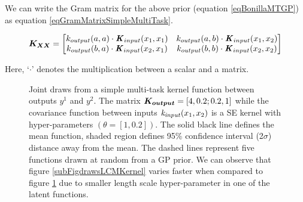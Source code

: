 We can write the Gram matrix for the above prior (equation \ref{eqBonillaMTGP}) as equation \ref{eqGramMatrixSimpleMultiTask}.

\begin{equation}\label{eqGramMatrixSimpleMultiTask}
   \boldsymbol{K_{XX}} =  \begin{bmatrix} k_{output}(a, a) \cdot \bm{\mathit{K}}_{input}(x_{1}, x_{1}) & 
k_{output}(a, b) \cdot \bm{\mathit{K}}_{input}(x_{1}, x_{2}) \\ 
k_{output}(b, a) \cdot \bm{\mathit{K}}_{input}(x_{2}, x_{1}) &
k_{output}(b, b) \cdot \bm{\mathit{K}}_{input}(x_{2}, x_{2}) 
\end{bmatrix}
\end{equation}


Here, `$\cdot$' denotes the multiplication between a scalar and a matrix. 

\begin{figure}[!ht]
  \centering
    \quad
{}\quad

       \caption{Joint draws from a simple multi-task kernel function between outputs $y^{1}$ and $y^{2}$. The matrix  $\boldsymbol{K_{output}} = [4 , 0.2; 0.2 , 1]$ while the covariance function between inputs $\mathit{k_{input}}(x_{1}, x_{2})$ is a SE kernel with hyper-parameters $(\theta = [1, 0.2])$. The solid black line defines the mean function, shaded region defines 95\% confidence interval (2$\sigma$) distance away from the mean. The dashed lines represent five functions drawn at random from a GP prior. We can observe that figure \ref{subFigdrawsLCMKernel} varies faster when compared to figure \ref{subFigdrawsBonillaKernel} due to smaller length scale hyper-parameter in one of the latent functions.}
       \label{subFigdrawsBonillaKernel}
\end{figure}

